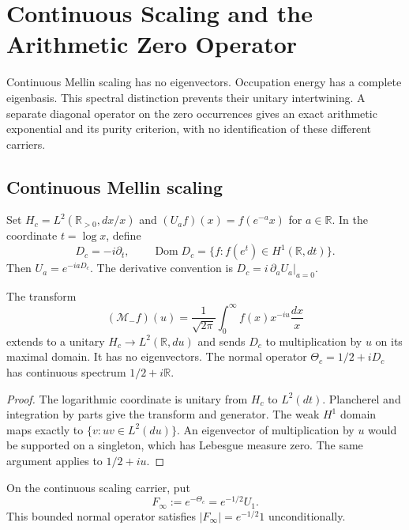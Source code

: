 \chapter{Continuous Scaling and the Arithmetic Zero Operator}
\label{v4-arith:w9-r2:archimedean-wilson-surface}

Continuous Mellin scaling has no eigenvectors. Occupation energy has
a complete eigenbasis. This spectral distinction prevents their
unitary intertwining. A separate diagonal operator on the zero
occurrences gives an exact arithmetic exponential and its purity
criterion, with no identification of these different carriers.

\section{Continuous Mellin scaling}
\begin{definition}
\label{v4-arith:w9-r2:def:scaling}
Set $H_c=L^2(\mathbb R_{>0},dx/x)$ and
$(U_a f)(x)=f(e^{-a}x)$ for $a\in\mathbb R$.
In the coordinate $t=\log x$, define
\[
 D_c=-i\partial_t,\qquad
 \operatorname{Dom}D_c=\{f:f(e^t)\in H^1(\mathbb R,dt)\}.
\]
Then $U_a=e^{-iaD_c}$.
The derivative convention is $D_c=i\,\partial_a U_a|_{a=0}$.
\end{definition}

\begin{theorem}
\label{v4-arith:w9-r2:lem:mellin}
The transform
\[
 (\mathcal M_-f)(u)=\frac1{\sqrt{2\pi}}
                  \int_0^\infty f(x)x^{-iu}\frac{dx}{x}
\]
extends to a unitary $H_c\to L^2(\mathbb R,du)$ and sends $D_c$
to multiplication by $u$ on its maximal domain.
It has no eigenvectors. The normal operator
$\Theta_c=1/2+iD_c$ has continuous spectrum $1/2+i\mathbb R$.
\end{theorem}
\begin{proof}
The logarithmic coordinate is unitary from $H_c$ to $L^2(dt)$.
Plancherel and integration by parts give the transform and generator.
The weak $H^1$ domain maps exactly to $\{v:uv\in L^2(du)\}$.
An eigenvector of multiplication by $u$ would be supported on a
singleton, which has Lebesgue measure zero. The same argument applies
to $1/2+iu$.
\end{proof}

\begin{definition}
\label{v4-arith:w9-r2:def:F-infty}
On the continuous scaling carrier, put
\[
 F_\infty:=e^{-\Theta_c}=e^{-1/2}U_1.
\]
This bounded normal operator satisfies
$|F_\infty|=e^{-1/2}1$ unconditionally.
\end{definition}

